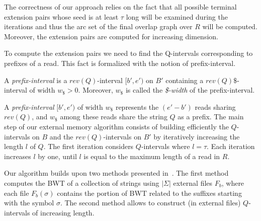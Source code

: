 \documentclass[runningheads,envcountsame,a4paper]{llncs}
\newcommand{\notaestesa}[2]{%
 \marginpar{\color{red!75!black}\textbf{\texttimes}}%
 {\color{red!75!black}%
 [\,\textbullet\,\textsf{\textbf{#1:}} %
 \textsf{\footnotesize#2}\,\textbullet\,]}%
}
\begin{document}
The correctness of our approach relies on the fact that all possible
terminal extension pairs whose seed is at least $\tau$ long will be examined during the iterations and thus
the arc set of the final overlap  graph over $R$ will be computed.
Moreover, the extension pairs are computed for increasing dimension.






To compute the extension pairs we need to find the Q-intervals  corresponding to prefixes of a read.
This fact is formalized with the notion of prefix-interval.

\begin{definition}
A \emph{prefix-interval} is a $rev(Q)$-interval $[b',e')$ on $B'$ containing
a $rev(Q)\$$-interval of width $w_{\$}>0$.
Moreover, $w_{\$}$ is called the \emph{\$-width}
of the prefix-interval.
\end{definition}

A \emph{prefix-interval} $[b',e')$ of width $w_{\$}$ represents the $(e'-b')$
reads sharing $rev(Q)$, and $w_{\$}$ among these reads share the string $Q$ as a
prefix.
%
The main step of our external memory algorithm consists of  building efficiently
the $Q$-intervals on $B$ and the $rev(Q)$-intervals on
$B'$ by iteratively increasing the length $l$ of $Q$.
The first iteration considers $Q$-intervals where $l=\tau$.
Each iteration increases $l$ by one, until $l$ is equal to the maximum length
of a read in $R$.


Our algorithm builds upon two methods presented in~\cite{Bauer2011,Cox2012}.
The first method computes the BWT of a collection of strings using $|\Sigma|$
external files $F_b$, where each file $F_b(\sigma)$ contains the portion of BWT related to the suffixes
starting with the symbol $\sigma$.
The second method allows to construct (in external files) $Q$-intervals
of increasing length.%

\begin{comment}
In particular, the procedure \emph{processInterval} given
in~\cite{Cox2012} is used in our algorithm to produce the sorted list
(lexicographical order) of the intervals of a given length $l$, from the
sorted list of the intervals of length $l-1$ (intervals of length $1$
can be easily obtained by means of the FM-index function $C$).
\notaestesa{Raffa}{Togliere lo pseudocodice della procedura processInterval: \'e della Rosone e non nostro.}.
\notaestesa{GDV}{ Concordo di togliere lo pseudocodice.
Bisogna dire però cosa calcola la procedura}

We extend the procedure \emph{processInterval} to
\emph{extendLinkedInterval}, where we produce not only the $Q$-intervals on $B$, but also the linked
$rev(Q)$-intervals on $B'$.
\end{comment}
\end{document}
